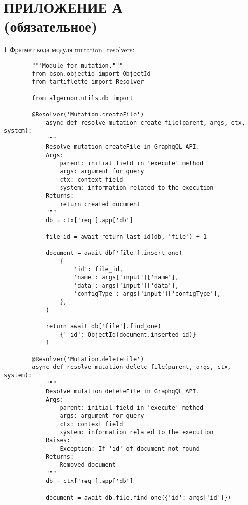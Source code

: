 \section*{\hfill ПРИЛОЖЕНИЕ А \\ \hspace*{13.5cm} (обязательное)}


1 Фрагмет кода модуля mutation\_resolvers:

\begin{Verbatim}
        """Module for mutation."""
        from bson.objectid import ObjectId
        from tartiflette import Resolver

        from algernon.utils.db import 

        @Resolver('Mutation.createFile')
            async def resolve_mutation_create_file(parent, args, ctx, system):
            """
            Resolve mutation createFile in GraphqQL API.
            Args:
                parent: initial field in 'execute' method
                args: argument for query
                ctx: context field
                system: information related to the execution
            Returns:
                return created document
            """
            db = ctx['req'].app['db']

            file_id = await return_last_id(db, 'file') + 1

            document = await db['file'].insert_one(
                {
                    'id': file_id,
                    'name': args['input']['name'],
                    'data': args['input']['data'],
                    'configType': args['input']['configType'],
                },
            )

            return await db['file'].find_one(
                {'_id': ObjectId(document.inserted_id)}
            )

        @Resolver('Mutation.deleteFile')
        async def resolve_mutation_delete_file(parent, args, ctx, system):
            """
            Resolve mutation deleteFile in GraphqQL API.
            Args:
                parent: initial field in 'execute' method
                args: argument for query
                ctx: context field
                system: information related to the execution
            Raises:
                Exception: If 'id' of document not found
            Returns:
                Removed document
            """
            db = ctx['req'].app['db']

            document = await db.file.find_one({'id': args['id']})


\end{Verbatim}
